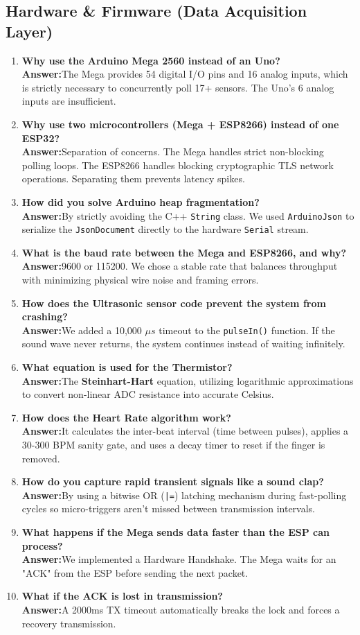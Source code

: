 \documentclass[12pt,a4paper]{article}
\newcommand{\keyword}[1]{\textcolor{keywordcolor}{\textbf{#1}}}
\newcommand{\Q}[1]{\textcolor{questioncolor}{\textbf{#1}}}
\newcommand{\A}{\textcolor{answercolor}{\textbf{Answer:}}}
\begin{document}
\subsection*{Hardware \& Firmware (Data Acquisition Layer)}
\begin{enumerate}
    \item \Q{Why use the Arduino Mega 2560 instead of an Uno?} \\ \A The Mega provides 54 digital I/O pins and 16 analog inputs, which is strictly necessary to concurrently poll 17+ sensors. The Uno's 6 analog inputs are insufficient.
    \item \Q{Why use two microcontrollers (Mega + ESP8266) instead of one ESP32?} \\ \A Separation of concerns. The Mega handles strict non-blocking polling loops. The ESP8266 handles blocking cryptographic TLS network operations. Separating them prevents latency spikes.
    \item \Q{How did you solve Arduino heap fragmentation?} \\ \A By strictly avoiding the C++ \texttt{String} class. We used \texttt{ArduinoJson} to serialize the \texttt{JsonDocument} directly to the hardware \texttt{Serial} stream.
    \item \Q{What is the baud rate between the Mega and ESP8266, and why?} \\ \A 9600 or 115200. We chose a stable rate that balances throughput with minimizing physical wire noise and framing errors.
    \item \Q{How does the Ultrasonic sensor code prevent the system from crashing?} \\ \A We added a 10,000 $\mu s$ timeout to the \texttt{pulseIn()} function. If the sound wave never returns, the system continues instead of waiting infinitely.
    \item \Q{What equation is used for the Thermistor?} \\ \A The \keyword{Steinhart-Hart} equation, utilizing logarithmic approximations to convert non-linear ADC resistance into accurate Celsius.
    \item \Q{How does the Heart Rate algorithm work?} \\ \A It calculates the inter-beat interval (time between pulses), applies a 30-300 BPM sanity gate, and uses a decay timer to reset if the finger is removed.
    \item \Q{How do you capture rapid transient signals like a sound clap?} \\ \A By using a bitwise OR (\texttt{|=}) latching mechanism during fast-polling cycles so micro-triggers aren't missed between transmission intervals.
    \item \Q{What happens if the Mega sends data faster than the ESP can process?} \\ \A We implemented a Hardware Handshake. The Mega waits for an "ACK" from the ESP before sending the next packet.
    \item \Q{What if the ACK is lost in transmission?} \\ \A A 2000ms TX timeout automatically breaks the lock and forces a recovery transmission.
\end{enumerate}
\end{document}
